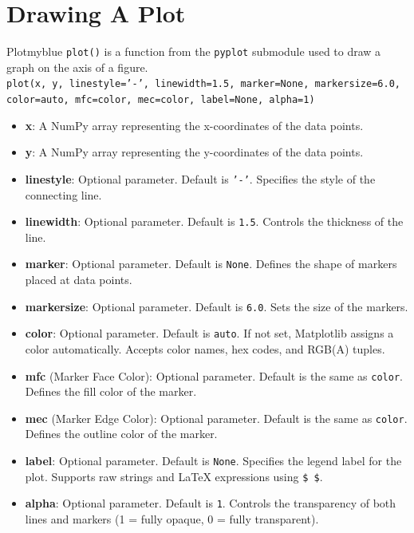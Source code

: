 \section{Drawing A Plot}
\begin{prettyBox}{Plot}{myblue}
\texttt{plot()} is a function from the \texttt{pyplot} submodule used to draw a graph on the axis of a figure.\\[0.05cm] 
\texttt{plot(x, y, linestyle='-', linewidth=1.5, marker=None, markersize=6.0, color=auto, mfc=color, mec=color, label=None, alpha=1)}

\begin{itemize}
    \item \textbf{x}: A NumPy array representing the x-coordinates of the data points.
    \item \textbf{y}: A NumPy array representing the y-coordinates of the data points.
    \item \textbf{linestyle}: Optional parameter. Default is \texttt{'-'}. Specifies the style of the connecting line.
    \item \textbf{linewidth}: Optional parameter. Default is \texttt{1.5}. Controls the thickness of the line.
    \item \textbf{marker}: Optional parameter. Default is \texttt{None}. Defines the shape of markers placed at data points.
    \item \textbf{markersize}: Optional parameter. Default is \texttt{6.0}. Sets the size of the markers.
    \item \textbf{color}: Optional parameter. Default is \texttt{auto}. If not set, Matplotlib assigns a color automatically. Accepts color names, hex codes, and RGB(A) tuples.
    \item \textbf{mfc} (Marker Face Color): Optional parameter. Default is the same as \texttt{color}. Defines the fill color of the marker.
    \item \textbf{mec} (Marker Edge Color): Optional parameter. Default is the same as \texttt{color}. Defines the outline color of the marker.
    \item \textbf{label}: Optional parameter. Default is \texttt{None}. Specifies the legend label for the plot. Supports raw strings and LaTeX expressions using \texttt{\$ \$}.
    \item \textbf{alpha}: Optional parameter. Default is \texttt{1}. Controls the transparency of both lines and markers (1 = fully opaque, 0 = fully transparent).
\end{itemize}
\end{prettyBox}

